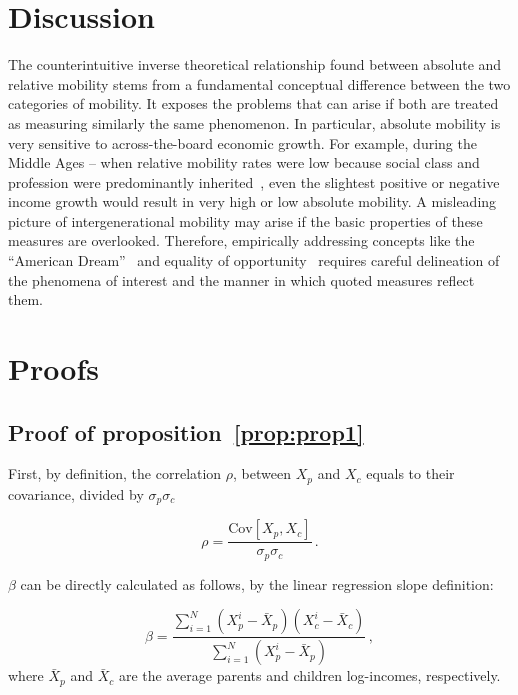 \documentclass[12pt,times,letter]{article}
\newcommand{\preflong}[1]{proposition~\ref{prop:#1}}
\newcommand{\be}{\begin{equation}}
\newcommand{\ee}{\end{equation}}
\numberwithin{equation}{section}
\begin{document}
\section{Discussion}

The counterintuitive inverse theoretical relationship found between absolute and relative mobility stems from a fundamental conceptual difference between the two categories of mobility. It exposes the problems that can arise if both are treated as measuring similarly the same phenomenon. In particular, absolute mobility is very sensitive to across-the-board economic growth. For example, during the Middle Ages -- when relative mobility rates were low because social class and profession were predominantly inherited~\citep{goldthorpe1982social,clark2014also}, even the slightest positive or negative income growth would result in very high or low absolute mobility. A misleading picture of intergenerational mobility may arise if the basic properties of these measures are overlooked. Therefore, empirically addressing concepts like the ``American Dream''~\citep{corak2009chasing,chetty2017fading} and equality of opportunity~\citep{roemer2000opportunity,chetty2014land} requires careful delineation of the phenomena of interest and the manner in which quoted measures reflect them.

\clearpage

\doublespacing


\clearpage

\doublespacing

\appendix

\section{Proofs}

\subsection{Proof of \preflong{prop1}}

First, by definition, the correlation $\rho$, between $X_p$ and $X_c$ equals to their covariance, divided by $\sigma_p\sigma_c$

\be
\rho = \frac{\text{Cov}\left[X_p,X_c\right]}{\sigma_p\sigma_c}\,.
\ee

$\beta$ can be directly calculated as follows, by the linear regression slope definition:

\be
\beta = \frac{\sum_{i=1}^{N} {\left(X_p^i - \bar{X}_p\right)\left(X_c^i - \bar{X}_c\right)}}{\sum_{i=1}^{N} {\left(X_p^i - \bar{X}_p\right)}}\,,
\ee
where $\bar{X}_p$ and $\bar{X}_c$ are the average parents and children log-incomes, respectively.
\end{document}
